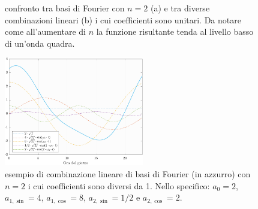 \begin{figure}[htb]
	\centering
	\quad
	\caption[Confronto tra basi di Fourier con $n=2$ e tra diverse combinazioni lineari]{confronto tra basi di Fourier con $n=2$ (a) e tra diverse combinazioni lineari (b) i cui coefficienti sono unitari. Da notare come all'aumentare di $n$ la funzione risultante tenda al livello basso di un'onda quadra.}
	\label{esempi_Fourier}
\end{figure}
\begin{figure}[htb]
	\centering
	\includegraphics[height=180px]{Immagini/1. Modello base/Spline Fourier con coefficienti non unitari}
	\caption[Esempio di combinazione lineare di basi di Fourier con $n=2$ i cui coefficienti sono diversi da \num{1}]{esempio di combinazione lineare di basi di Fourier (in azzurro) con $n=2$ i cui coefficienti sono diversi da \num{1}. Nello specifico: $a_0 = 2$, $a_{1,\sin} = 4$, $a_{1,\cos} = 8$, $a_{2,\sin} = 1/2$ e $a_{2,\cos} = 2$.}
	\label{esempio_Fourier_coef_non_unitari}
\end{figure}

